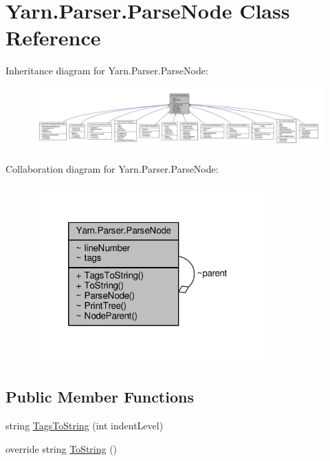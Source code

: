 \hypertarget{a00138}{\section{Yarn.\-Parser.\-Parse\-Node Class Reference}
\label{a00138}
}


Inheritance diagram for Yarn.\-Parser.\-Parse\-Node\-:
\nopagebreak
\begin{figure}[H]
\begin{center}
\leavevmode
\includegraphics[width=350pt]{a00679}
\end{center}
\end{figure}


Collaboration diagram for Yarn.\-Parser.\-Parse\-Node\-:
\nopagebreak
\begin{figure}[H]
\begin{center}
\leavevmode
\includegraphics[width=254pt]{a00680}
\end{center}
\end{figure}
\subsection*{Public Member Functions}
\begin{DoxyCompactItemize}
\item 
string \hyperlink{a00138_a054f36c80d5eeacd569a8859f599af67}{Tags\-To\-String} (int indent\-Level)
\item 
override string \hyperlink{a00138_a18c67cb16090d0889bb9d6c8c6c565f8}{To\-String} ()
\end{DoxyCompactItemize}
